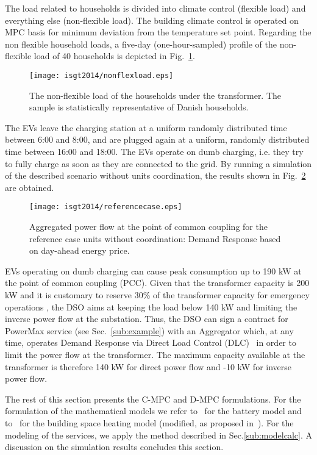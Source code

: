 The load related to households is divided into climate control (flexible load) and everything else (non-flexible load). The building climate control is operated on MPC basis for minimum deviation from the temperature set point. Regarding the non flexible household loads, a five-day (one-hour-sampled) profile of the non-flexible load of 40 households is depicted in Fig.~\ref{fig:nonflexible}.

\begin{figure}[t]  
	\centering
	\texttt{[image: isgt2014/nonflexload.eps]}
	\caption{The non-flexible load of the households under the transformer. The sample is statistically representative of Danish households.}\label{fig:nonflexible}
\end{figure}

The EVs leave the charging station at a uniform randomly distributed time between 6:00  and 8:00, and are plugged again at a uniform, randomly distributed time between 16:00 and 18:00. The EVs operate on dumb charging, i.e. they try to fully charge as soon as they are connected to the grid.  %
By running a simulation of the described scenario without units coordination, the results shown in Fig.~\ref{fig:referencecase} are obtained.

\begin{figure}[t]  
	\centering
	\texttt{[image: isgt2014/referencecase.eps]}
	\caption{Aggregated power flow at the point of common coupling for the reference case units without coordination: Demand Response based on day-ahead energy price.}\label{fig:referencecase}
\end{figure}

EVs operating on dumb charging can cause peak consumption up to 190 kW at the point of common coupling (PCC). Given that the transformer capacity is 200 kW and it is customary to reserve 30\% of the transformer capacity for emergency operations \cite{Engel}, the DSO aims at keeping the load below 140 kW and limiting the inverse power flow at the substation. Thus, the DSO can sign a contract for PowerMax service (see Sec.~\ref{sub:example}) with an Aggregator which, at any time, operates Demand Response via Direct Load Control (DLC)~\cite{kosek2013overview} in order to limit the power flow at the transformer. The maximum capacity available at the transformer is therefore 140 kW for direct power flow and -10 kW for inverse power flow.

The rest of this section presents the C-MPC and D-MPC formulations. For the formulation of the mathematical models we refer to~\cite{6345063} for the battery model and to~\cite{Bacher20111511} for the building space heating model (modified, as proposed in~\cite{costanzo2013coordination}). For the modeling of the services, we apply the method described in Sec.\ref{sub:modelcalc}. A discussion on the simulation results concludes this section.
